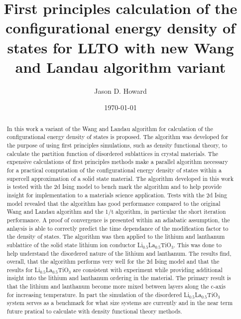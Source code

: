 \documentclass[aps,pre,reprint,superscriptaddress,showkeys]{revtex4-2}
\begin{document}
\newcommand{\RNum}[1]{\uppercase\expandafter{\romannumeral #1\relax}}


\title{First principles calculation of the configurational energy density of states for LLTO with new Wang and Landau algorithm variant }

\author{Jason D. Howard}
\date{\today}


\begin{abstract}
In this work  a variant of the Wang and Landau algorithm   for calculation of  the configurational energy density of states is proposed. The algorithm was developed for the purpose of   using first principles simulations, such as density functional theory, to calculate the partition function of disordered sublattices in crystal materials. The expensive calculations of first principles methods make a parallel algorithm necessary for a practical computation of the configurational energy density of states within a supercell approximation of a solid state material.  The algorithm developed in this work is tested with the 2d Ising model to bench mark the algorithm and to help provide insight for implementation to a materials science application. Tests with the 2d Ising model revealed that the algorithm has good performance compared to the original Wang and Landau algorithm and the 1/t algorithm, in particular the short iteration performance. A proof of convergence is presented within an adiabatic assumption, the anlaysis is able to correctly predict the time dependance of the modification factor to the density of states.  The algorithm was then applied to the lithium and lanthanum sublattice of the solid state lithium ion conductor Li$_{0.5}$La$_{0.5}$TiO$_{3}$. This was done to help understand the disordered nature of the lithium and lanthanum. The results find, overall, that the algorithm performs very well for the 2d Ising model and that the results for Li$_{0.5}$La$_{0.5}$TiO$_{3}$ are consistent with experiment while providing additional insight into the lithium and lanthanum ordering in the material. The primary result is that the lithium and lanthanum become more mixed between layers along the c-axis for increasing temperature. In part the simulation of the disordered Li$_{0.5}$La$_{0.5}$TiO$_{3}$ system serves as a benchmark for what size systems are currently and in the near term future pratical to calculate with density functional theory methods. 
\end{abstract}
\maketitle
\end{document}
